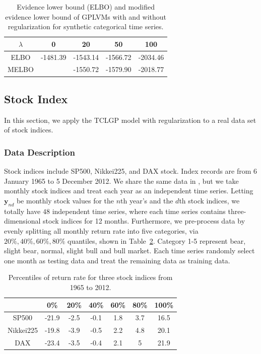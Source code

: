 \documentclass{article}
\begin{document}
\begin{table}[ht!]
	\centering
	\begin{tabular}{|c|c|c|c|c|}
		\hline
		$\lambda$ & 0 & 20 & 50 & 100 \\
		\hline
		ELBO & -1481.39  & -1543.14 & -1566.72 & -2034.46 \\
		\hline
		MELBO &  & -1550.72 & -1579.90 & -2018.77 \\
		\hline
	\end{tabular}
	\caption{Evidence lower bound (ELBO) and modified evidence lower bound of GPLVMs with and without regularization for synthetic categorical time series.}
	\label{tab:SIM}
\end{table}

\subsection{Stock Index}
In this section, we apply the TCLGP model with regularization to a real data set of stock indices.

\subsubsection{Data Description}
Stock indices include SP500, Nikkei225, and DAX stock. Index records are from 6 January 1965 to 5 December 2012. We share the same data in \cite{Joao_2014}, but we take monthly stock indices and treat each year as an independent time series. Letting $\bm y_{nd}$ be monthly stock values for the $n$th year's and the $d$th stock indices, we totally have $48$ independent time series, where each time series contains three-dimensional stock indices for 12 months. Furthermore, we pre-process data by evenly splitting all monthly return rate into five categories, via $20\%, 40\%, 60\%, 80\%$ quantiles, shown in Table~\ref{quan}. Category 1-5 represent bear, slight bear, normal, slight bull and bull market. Each time series randomly select one month as testing data and treat the remaining data as training data.

\begin{table}[ht!]
	\centering
	\begin{tabular}{|c|c|c|c|c|c|c|}
		\hline
		& 0\% & 20\% & 40\% & 60\% & 80\% & 100\% \\
		\hline
		SP500 & -21.9 & -2.5 & -0.1 & 1.8 & 3.7 & 16.5 \\
		\hline
		Nikkei225 & -19.8 & -3.9 & -0.5 & 2.2 & 4.8 & 20.1 \\
		\hline
		DAX & -23.4 & -3.5 & -0.4 & 2.1 & 5 & 21.9 \\
		\hline
	\end{tabular}
    \caption{Percentiles of return rate for three stock indices from 1965 to 2012.}
	\label{quan}
\end{table}
\end{document}
